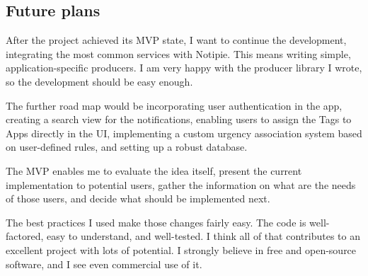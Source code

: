 \subsection{Future plans}\label{sec:future-plans}

After the project achieved its MVP state,
I want to continue the development,
integrating the most common services
with Notipie.
This means writing simple,
application-specific producers.
I am very happy with the producer library I wrote,
so the development should be easy enough.

The further road map would be
incorporating user authentication in the app,
creating a search view for the notifications,
enabling users to assign the Tags to Apps
directly in the UI,
implementing a custom urgency association system
based on user-defined rules,
and setting up a robust database.

The MVP enables me to evaluate the idea itself,
present the current implementation to potential users,
gather the information on what are the needs
of those users,
and decide what should be implemented next.

The best practices I used make those changes
fairly easy.
The code is well-factored,
easy to understand,
and well-tested.
I think all of that contributes
to an excellent project
with lots of potential.
I strongly believe in
free and open-source software,
and I see even commercial use of it.
